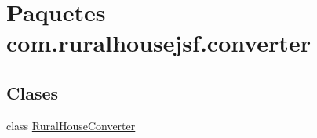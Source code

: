 \hypertarget{namespacecom_1_1ruralhousejsf_1_1converter}{}\section{Paquetes com.\+ruralhousejsf.\+converter}
\label{namespacecom_1_1ruralhousejsf_1_1converter}
\subsection*{Clases}
\begin{DoxyCompactItemize}
\item 
class \mbox{\hyperlink{classcom_1_1ruralhousejsf_1_1converter_1_1_rural_house_converter}{Rural\+House\+Converter}}
\end{DoxyCompactItemize}
